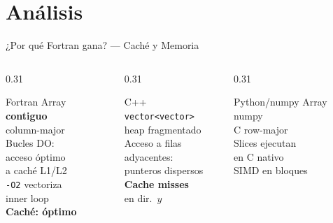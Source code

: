 \documentclass[aspectratio=169, 11pt]{beamer}
\begin{document}
\section{Análisis}

\begin{frame}{¿Por qué Fortran gana? — Caché y Memoria}
  \begin{columns}[T]
    \begin{column}{0.31\textwidth}
      \begin{exampleblock}{\centering Fortran}
        \centering\vspace{0.1cm}
        Array \textbf{contiguo}\\column-major\\[0.2cm]
        Bucles DO:\\acceso óptimo\\a caché L1/L2\\[0.2cm]
        \texttt{-O2} vectoriza\\inner loop\\[0.2cm]
        \textcolor{verdek}{\textbf{Caché: óptimo}}
      \end{exampleblock}
    \end{column}
    \begin{column}{0.31\textwidth}
      \begin{alertblock}{\centering C++}
        \centering\vspace{0.1cm}
        \texttt{vector<vector>}\\heap fragmentado\\[0.2cm]
        Acceso a filas\\adyacentes:\\punteros dispersos\\[0.2cm]
        \textcolor{rojok}{\textbf{Cache misses}}\\en dir.\ $y$
      \end{alertblock}
    \end{column}
    \begin{column}{0.31\textwidth}
      \begin{block}{\centering Python/numpy}
        \centering\vspace{0.1cm}
        Array numpy\\C row-major\\[0.2cm]
        Slices ejecutan\\en C nativo\\SIMD en bloques\\[0.2cm]

\end{block}
\end{column}
\end{columns}
\end{frame}
\end{document}
